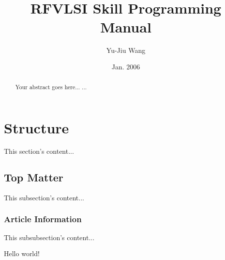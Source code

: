 \documentclass{article}
\begin{document}
\title{RFVLSI Skill Programming Manual}
\author{Yu-Jiu Wang}
\date{Jan. 2006}
\maketitle
\begin{abstract}
Your abstract goes here...
...
\end{abstract}


\section{Structure}
This section's content...

\subsection{Top Matter}
This subsection's content...

\subsubsection{Article Information}
This subsubsection's content...

Hello world!
\end{document}
